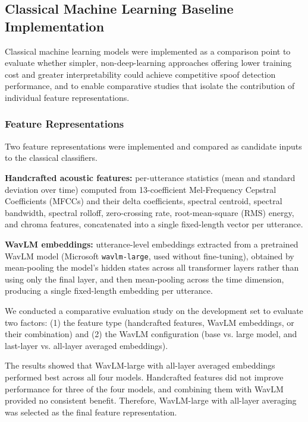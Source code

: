 \subsection{Classical Machine Learning Baseline Implementation}

Classical machine learning models were implemented as a comparison point to evaluate whether simpler, non-deep-learning approaches offering lower training cost and greater interpretability could achieve competitive spoof detection performance, and to enable comparative studies that isolate the contribution of individual feature representations.

\subsubsection{Feature Representations}

Two feature representations were implemented and compared as candidate inputs to the classical classifiers.

\textbf{Handcrafted acoustic features:} per-utterance statistics (mean and standard deviation over time) computed from 13-coefficient Mel-Frequency Cepstral Coefficients (MFCCs) and their delta coefficients, spectral centroid, spectral bandwidth, spectral rolloff, zero-crossing rate, root-mean-square (RMS) energy, and chroma features, concatenated into a single fixed-length vector per utterance.

\textbf{WavLM embeddings:} utterance-level embeddings extracted from a pretrained WavLM model \cite{Chen2022_wavlm} (Microsoft \texttt{wavlm-large}, used without fine-tuning), obtained by mean-pooling the model's hidden states across all transformer layers rather than using only the final layer, and then mean-pooling across the time dimension, producing a single fixed-length embedding per utterance.

We conducted a comparative evaluation study on the development set to evaluate two factors: (1) the feature type (handcrafted features, WavLM embeddings, or their combination) and (2) the WavLM configuration (base vs. large model, and last-layer vs. all-layer averaged embeddings).

The results showed that WavLM-large with all-layer averaged embeddings performed best across all four models. Handcrafted features did not improve performance for three of the four models, and combining them with WavLM provided no consistent benefit. Therefore, WavLM-large with all-layer averaging was selected as the final feature representation.

